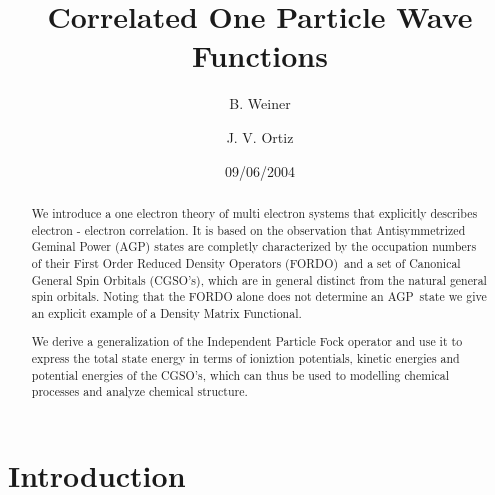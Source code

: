 \documentclass[aps,preprint]{revtex4}%
\begin{document}
\preprint{ }
\title{Correlated One Particle Wave Functions}
\author{B. Weiner}
\author{J. V. Ortiz}
\pacs{}

\begin{abstract}
We introduce a one electron theory of multi electron systems that explicitly
describes electron - electron correlation. It is based on the observation that
Antisymmetrized Geminal Power (AGP) states are completly characterized by the
occupation numbers of their First Order Reduced Density Operators (FORDO)\ and
a set of Canonical General Spin Orbitals (CGSO's), which are in general
distinct from the natural general spin orbitals. Noting that the FORDO alone
does not determine an AGP\ state we give an explicit example of a Density
Matrix Functional.

We derive a generalization of the Independent Particle Fock operator and use
it to express the total state energy in terms of ioniztion potentials, kinetic
energies and potential energies of the CGSO's, which can thus be used to
modelling chemical processes and analyze chemical structure.

\end{abstract}
\date{09/06/2004}
\maketitle
\tableofcontents


\section{Introduction \label{intro}}
\end{document}
